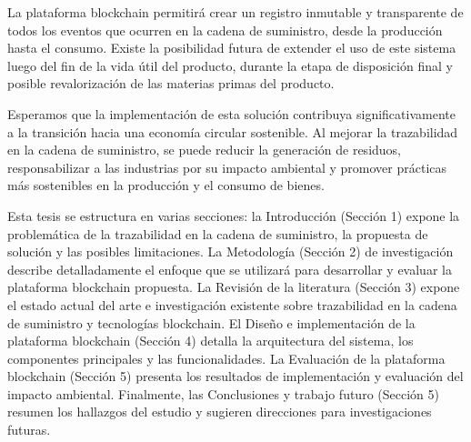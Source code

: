\documentclass[main.tex]{subfiles}
\begin{document}
La plataforma blockchain permitirá crear un registro inmutable y transparente de todos los eventos que ocurren en la cadena de suministro, desde la producción hasta el consumo. Existe la posibilidad futura de extender el uso de este sistema luego del fin de la vida útil del producto, durante la etapa de disposición final y posible revalorización de las materias primas del producto.

Esperamos que la implementación de esta solución contribuya significativamente a la transición hacia una economía circular sostenible. Al mejorar la trazabilidad en la cadena de suministro, se puede reducir la generación de residuos, responsabilizar a las industrias por su impacto ambiental y promover prácticas más sostenibles en la producción y el consumo de bienes.

Esta tesis se estructura en varias secciones: la Introducción (Sección 1) expone la problemática de la trazabilidad en la cadena de suministro, la propuesta de solución y las posibles limitaciones. La Metodología (Sección 2) de investigación describe detalladamente el enfoque que se utilizará para desarrollar y evaluar la plataforma blockchain propuesta. La Revisión de la literatura (Sección 3) expone el estado actual del arte e investigación existente sobre trazabilidad en la cadena de suministro y tecnologías blockchain. El Diseño e implementación de la plataforma blockchain (Sección 4) detalla la arquitectura del sistema, los componentes principales y las funcionalidades. La Evaluación de la plataforma blockchain (Sección 5) presenta los resultados de implementación y evaluación del impacto ambiental. Finalmente, las Conclusiones y trabajo futuro (Sección 5) resumen los hallazgos del estudio y sugieren direcciones para investigaciones futuras.
\end{document}
